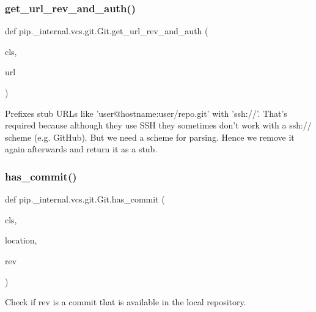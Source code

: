 \subsubsection{\texorpdfstring{get\+\_\+url\+\_\+rev\+\_\+and\+\_\+auth()}{get\_url\_rev\_and\_auth()}}
{\footnotesize\ttfamily def pip.\+\_\+internal.\+vcs.\+git.\+Git.\+get\+\_\+url\+\_\+rev\+\_\+and\+\_\+auth (\begin{DoxyParamCaption}\item[{}]{cls,  }\item[{}]{url }\end{DoxyParamCaption})}

\begin{DoxyVerb}Prefixes stub URLs like 'user@hostname:user/repo.git' with 'ssh://'.
That's required because although they use SSH they sometimes don't
work with a ssh:// scheme (e.g. GitHub). But we need a scheme for
parsing. Hence we remove it again afterwards and return it as a stub.
\end{DoxyVerb}
 \mbox{\label{classpip_1_1__internal_1_1vcs_1_1git_1_1Git_aca80e2221a4dd6270232c1551c83904f}} 
\subsubsection{\texorpdfstring{has\+\_\+commit()}{has\_commit()}}
{\footnotesize\ttfamily def pip.\+\_\+internal.\+vcs.\+git.\+Git.\+has\+\_\+commit (\begin{DoxyParamCaption}\item[{}]{cls,  }\item[{}]{location,  }\item[{}]{rev }\end{DoxyParamCaption})}

\begin{DoxyVerb}Check if rev is a commit that is available in the local repository.
\end{DoxyVerb}
 \mbox{\label{classpip_1_1__internal_1_1vcs_1_1git_1_1Git_af33075c24ef8cd2d43d81938b8584a79}} 
